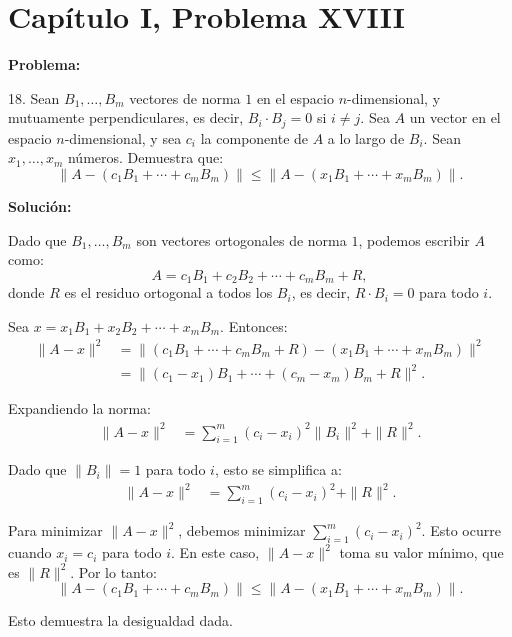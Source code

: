 \section*{Capítulo I, Problema XVIII}

\textbf{Problema:}

18. Sean $B_1, \dots, B_m$ vectores de norma $1$ en el espacio $n$-dimensional, y mutuamente perpendiculares, es decir, $B_i \cdot B_j = 0$ si $i \neq j$. Sea $A$ un vector en el espacio $n$-dimensional, y sea $c_i$ la componente de $A$ a lo largo de $B_i$. Sean $x_1, \dots, x_m$ números. Demuestra que:
\[
    \|A - (c_1B_1 + \cdots + c_mB_m)\| \leq \|A - (x_1B_1 + \cdots + x_mB_m)\|.
\]

\textbf{Solución:}

Dado que $B_1, \dots, B_m$ son vectores ortogonales de norma $1$, podemos escribir $A$ como:
\[
    A = c_1B_1 + c_2B_2 + \cdots + c_mB_m + R,
\]
donde $R$ es el residuo ortogonal a todos los $B_i$, es decir, $R \cdot B_i = 0$ para todo $i$.

Sea $x = x_1B_1 + x_2B_2 + \cdots + x_mB_m$. Entonces:
\begin{align*}
    \|A - x\|^2 &= \|(c_1B_1 + \cdots + c_mB_m + R) - (x_1B_1 + \cdots + x_mB_m)\|^2 \\
    &= \|(c_1 - x_1)B_1 + \cdots + (c_m - x_m)B_m + R\|^2.
\end{align*}

Expandiendo la norma:
\begin{align*}
    \|A - x\|^2 &= \sum_{i=1}^m (c_i - x_i)^2 \|B_i\|^2 + \|R\|^2.
\end{align*}

Dado que $\|B_i\| = 1$ para todo $i$, esto se simplifica a:
\begin{align*}
    \|A - x\|^2 &= \sum_{i=1}^m (c_i - x_i)^2 + \|R\|^2.
\end{align*}

Para minimizar $\|A - x\|^2$, debemos minimizar $\sum_{i=1}^m (c_i - x_i)^2$. Esto ocurre cuando $x_i = c_i$ para todo $i$. En este caso, $\|A - x\|^2$ toma su valor mínimo, que es $\|R\|^2$. Por lo tanto:
\[
    \|A - (c_1B_1 + \cdots + c_mB_m)\| \leq \|A - (x_1B_1 + \cdots + x_mB_m)\|.
\]

Esto demuestra la desigualdad dada.
